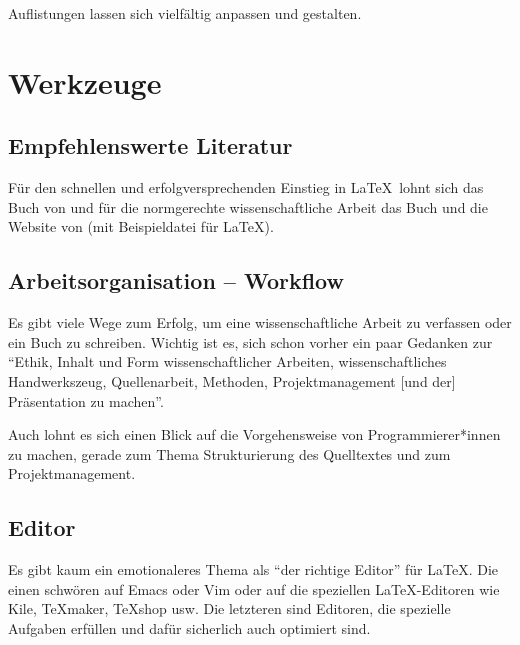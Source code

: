 \documentclass[12pt,	%
				headings=small,		%
				toc=bibliography,	%
			]	%
{scrreprt}		%
\begin{document}
			Auflistungen lassen sich vielfältig anpassen und gestalten.
	
	

\chapter{Werkzeuge}
\label{cha:werkzeuge}
\section{Empfehlenswerte Literatur}
	\label{sec:literaturempfehlung}
	Für den schnellen und erfolgversprechenden Einstieg in \LaTeX\ lohnt sich das Buch von \textcite{schlosser:einfuehrung} und für die normgerechte wissenschaftliche Arbeit das Buch und die Website von \textcite{scholz}(mit Beispieldatei für \LaTeX\autocite{scholz:latexvorlage}).

\section{Arbeitsorganisation -- Workflow}
\label{ref:ArbeitsorganisationWorkflow}
Es gibt viele Wege zum Erfolg, um eine wissenschaftliche Arbeit zu verfassen oder ein Buch zu schreiben.\autocite{rmf:workflow} Wichtig ist es, sich schon vorher ein paar Gedanken zur \enquote{Ethik, Inhalt und Form wissenschaftlicher Arbeiten, wissenschaftliches Handwerkszeug, Quellenarbeit, Methoden, Projektmanagement [und der] Präsentation zu machen}.\autocite{w3l} 

Auch lohnt es sich einen Blick auf die Vorgehensweise von Programmierer*innen zu machen, gerade zum Thema Strukturierung des Quelltextes und zum Projektmanagement.\autocite{passig}





\section{Editor}
\label{sec:editor}
	Es gibt kaum ein emotionaleres Thema als \enquote{der richtige Editor} für \LaTeX. Die einen schwören auf \textsf{Emacs} oder \textsf{Vim} oder auf die speziellen \LaTeX-Editoren wie \textsf{Kile}, \textsf{\TeX{}maker}, \textsf{\TeX{}shop} usw. 
	Die letzteren sind Editoren, die spezielle Aufgaben erfüllen und dafür sicherlich auch optimiert sind. 
	
\end{document}
